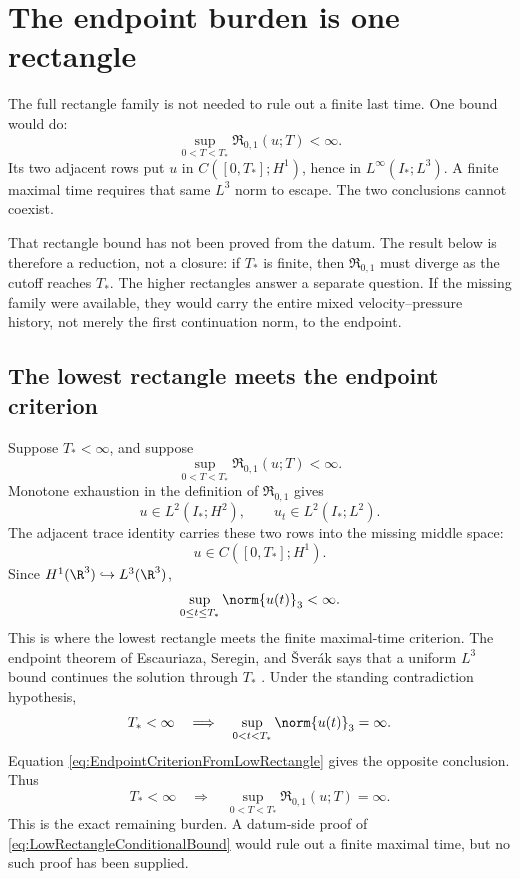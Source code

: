 \clearpage
\section{The endpoint burden is one rectangle}\label{sec:TheMissingEstimateAndGlobalSmoothness}

The full rectangle family is not needed to rule out a finite last time.
One bound would do:
\[
  \sup_{0<T<T_*}\mathfrak R_{0,1}(u;T)<\infty.
\]
Its two adjacent rows put \(u\) in \(C([0,T_*];H^1)\), hence in
\(L^\infty(I_*;L^3)\).  A finite maximal time requires that same \(L^3\) norm to
escape.  The two conclusions cannot coexist.

That rectangle bound has not been proved from the datum.  The result below is therefore
a reduction, not a closure: if \(T_*\) is finite, then \(\mathfrak R_{0,1}\) must diverge
as the cutoff reaches \(T_*\).  The higher rectangles answer a separate question.  If
the missing family were available, they would carry the entire mixed velocity--pressure
history, not merely the first continuation norm, to the endpoint.

\subsection{The lowest rectangle meets the endpoint criterion}\label{sub:FromFiniteRectanglesToClassicalEstimates}

Suppose \(T_*<\infty\), and suppose
\begin{equation}\label{eq:LowRectangleConditionalBound}
  \sup_{0<T<T_*}\mathfrak R_{0,1}(u;T)<\infty.
\end{equation}
Monotone exhaustion in the definition of \(\mathfrak R_{0,1}\) gives
\[
  u\in L^2(I_*;H^2),
  \qquad
  u_t\in L^2(I_*;L^2).
\]
The adjacent trace identity carries these two rows into the missing middle space:
\[
  u\in C([0,T_*];H^1).
\]
Since \(H^1(\R^3)\hookrightarrow L^3(\R^3)\),
\begin{equation}\label{eq:EndpointCriterionFromLowRectangle}
  \sup_{0\leq t\leq T_*}\norm{u(t)}_3<\infty.
\end{equation}
This is where the lowest rectangle meets the finite maximal-time criterion.
The endpoint theorem of Escauriaza, Seregin, and \v{S}ver\'ak says that a uniform
\(L^3\) bound continues the solution through \(T_*\)
\parencite{EscauriazaSereginSverak2003}.  Under the standing contradiction hypothesis,
\begin{equation}\label{eq:FiniteTimeLThreeEscape}
  T_*<\infty
  \quad\Longrightarrow\quad
  \sup_{0<t<T_*}\norm{u(t)}_3=\infty.
\end{equation}
Equation \eqref{eq:EndpointCriterionFromLowRectangle} gives the opposite conclusion.
Thus
\begin{equation}\label{eq:LowRectangleEndpointReduction}
  T_*<\infty
  \quad\Longrightarrow\quad
  \sup_{0<T<T_*}\mathfrak R_{0,1}(u;T)=\infty.
\end{equation}
This is the exact remaining burden.  A datum-side proof of
\eqref{eq:LowRectangleConditionalBound} would rule out a finite maximal time, but no
such proof has been supplied.

